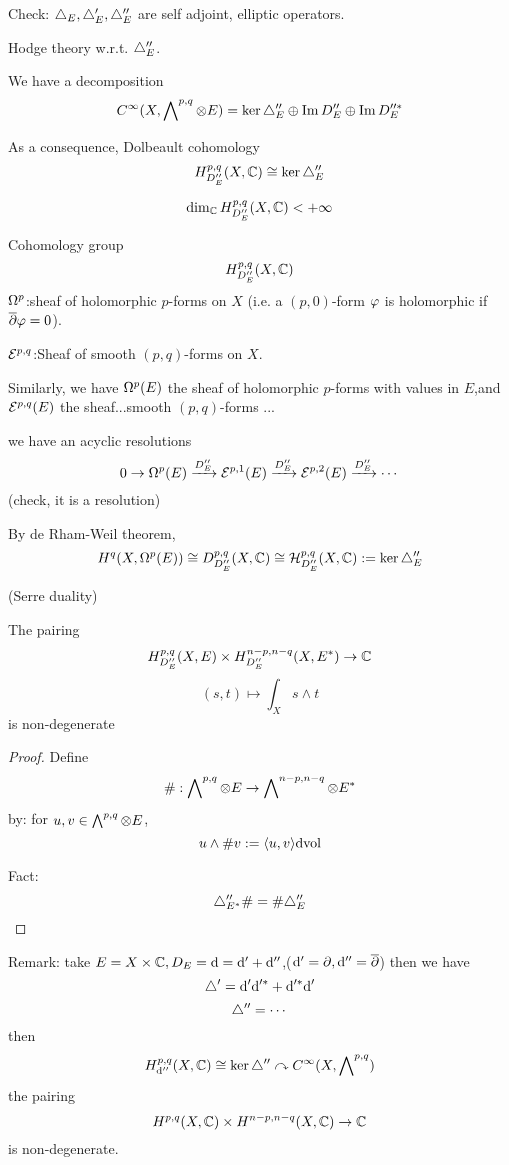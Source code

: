 Check: $\triangle_E,\triangle_E',\triangle_E''$ are self adjoint, elliptic operators.

Hodge theory w.r.t. $\triangle_E''$.

\begin{thm}
We have a decomposition
$$C^\infty(X,\bigwedge\nolimits^{p,q}\otimes E)=
\ker\triangle_E''\oplus\operatorname{Im} D_E''\oplus \operatorname{Im} D_E''^*$$

As a consequence, Dolbeault cohomology
$$H^{p,q}_{D_E''}(X,\mathbb{C})\cong
\ker\triangle_E''$$
\end{thm}

\begin{cor}
$$\dim_{\mathbb{C}}H^{p,q}_{D_E''}(X,\mathbb{C})<+\infty$$
\end{cor}

Cohomology group
$$H^{p,q}_{D_E''}(X,\mathbb{C})$$
$\Omega^p$:sheaf of holomorphic $p$-forms on $X$
(i.e. a $(p,0)$-form $\varphi$ is holomorphic if $\overline{\partial}\varphi=0$).

$\mathcal{E}^{p,q}$:Sheaf of smooth $(p,q)$-forms on $X$.

Similarly, we have $\Omega^p(E)$ the sheaf of holomorphic $p$-forms
with values in $E$,and $\mathcal{E}^{p,q}(E)$ the sheaf...smooth $(p,q)$-forms ...

we have an acyclic resolutions
$$0\to\Omega^p(E)\xrightarrow{D_E''}
\mathcal{E}^{p,1}(E)\xrightarrow{D_E''}
\mathcal{E}^{p,2}(E)\xrightarrow{D_E''}\cdots$$
(check, it is a resolution)

By de Rham-Weil theorem,
$$H^q(X,\Omega^p(E))\cong D^{p,q}_{D_E''}(X,\mathbb{C})
\cong \mathcal{H}^{p,q}_{D_E''}(X,\mathbb{C}):=\ker\triangle_E''$$

\begin{thm}(Serre duality)

The pairing
$$H^{p,q}_{D_E''}(X,E)
\times H^{n-p,n-q}_{D_E''}(X,E^*)\to\mathbb{C}$$
$$(s,t)\mapsto\int_X s\wedge t$$
is non-degenerate
\end{thm}

\begin{proof}Define
$$\#:\bigwedge\nolimits^{p,q}\otimes E\to \bigwedge\nolimits^{n-p,n-q}\otimes E^*$$
by: for $u,v\in\bigwedge\nolimits^{p,q}\otimes E$,
$$u\wedge\# v:=\langle u,v \rangle\mathrm{d}\text{vol}$$

Fact:
$$\triangle_{E^*}''\#=\#\triangle_E''$$
\end{proof}

Remark: take $E=X\times \mathbb{C},D_E=\mathrm{d}=\mathrm{d}'+\mathrm{d}''$,($\mathrm{d}'=\partial,\mathrm{d}''=\overline{\partial}$)
 then we have
 $$\triangle'=\mathrm{d}'\mathrm{d}'^*+\mathrm{d}'^*\mathrm{d}'$$
 $$\triangle''=\cdots$$
then
$$H^{p,q}_{\mathrm{d}''}(X,\mathbb{C})\cong\ker\triangle''\curvearrowright C^\infty(X,\bigwedge\nolimits^{p,q})$$
the pairing
$$H^{p,q}(X,\mathbb{C})\times H^{n-p,n-q}(X,\mathbb{C})\to\mathbb{C}$$
is non-degenerate.



















